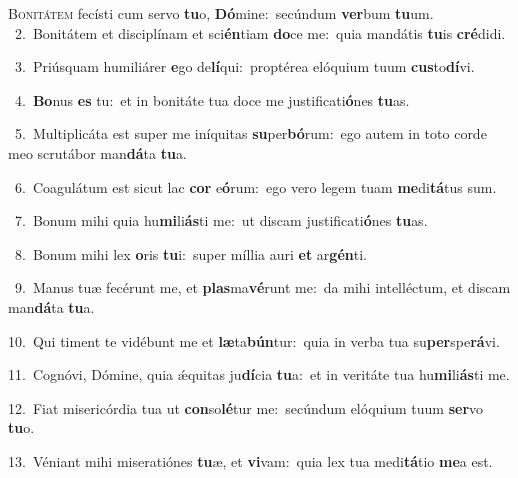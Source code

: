 \lettrine{\initial\textcolor{\initialcolor}{B}}{onitátem} fecísti cum servo \textbf{tu}\-o, \textbf{Dó}\-mine:~\star secúndum \textbf{ver}\-bum \textbf{tu}\-um.\\
{\numbfont\textcolor{\numbcolor}{~2.}}~Bonitátem et disciplínam et sci\-\textbf{én}\-tiam \textbf{do}\-ce me:~\star quia mandátis \textbf{tu}\-is \textbf{cré}\-didi.\par
{\numbfont\textcolor{\numbcolor}{~3.}}~Priúsquam humiliárer \textbf{e}\-go de\-\textbf{lí}\-qui:~\star proptérea elóquium tuum \textbf{cus}\-to\-\textbf{dí}\-vi.\par
{\numbfont\textcolor{\numbcolor}{~4.}}~\-\textbf{Bo}\-nus \textbf{es} tu:~\star et in bonitáte tua doce me justificati\-\textbf{ó}\-nes \textbf{tu}\-as.\par
{\numbfont\textcolor{\numbcolor}{~5.}}~Multiplicáta est super me iníquitas \textbf{su}\-per\-\textbf{bó}\-rum:~\star ego autem in toto corde meo scrutábor man\-\textbf{dá}\-ta \textbf{tu}\-a.\par
{\numbfont\textcolor{\numbcolor}{~6.}}~Coagulátum est sicut lac \textbf{cor} e\-\textbf{ó}\-rum:~\star ego vero legem tuam \textbf{me}\-di\-\textbf{tá}\-tus sum.\par
{\numbfont\textcolor{\numbcolor}{~7.}}~Bonum mihi quia hu\-\textbf{mi}\-li\-\textbf{ás}\-ti me:~\star ut discam justificati\-\textbf{ó}\-nes \textbf{tu}\-as.\par
{\numbfont\textcolor{\numbcolor}{~8.}}~Bonum mihi lex \textbf{o}\-ris \textbf{tu}\-i:~\star super míllia auri \textbf{et} ar\-\textbf{gén}\-ti.\par
{\numbfont\textcolor{\numbcolor}{~9.}}~Manus tuæ fecérunt me, et \textbf{plas}\-ma\-\textbf{vé}\-runt me:~\star da mihi intelléctum, et discam man\-\textbf{dá}\-ta \textbf{tu}\-a.\par
{\numbfont\textcolor{\numbcolor}{10.}}~Qui timent te vidébunt me et \textbf{læ}\-ta\-\textbf{bún}\-tur:~\star quia in verba tua su\-\textbf{per}\-spe\-\textbf{rá}\-vi.\par
{\numbfont\textcolor{\numbcolor}{11.}}~Cognóvi, Dómine, quia ǽquitas ju\-\textbf{dí}\-cia \textbf{tu}\-a:~\star et in veritáte tua hu\-\textbf{mi}\-li\-\textbf{ás}\-ti me.\par
{\numbfont\textcolor{\numbcolor}{12.}}~Fiat misericórdia tua ut \textbf{con}\-so\-\textbf{lé}\-tur me:~\star secúndum elóquium tuum \textbf{ser}\-vo \textbf{tu}\-o.\par
{\numbfont\textcolor{\numbcolor}{13.}}~Véniant mihi miseratiónes \textbf{tu}\-æ, et \textbf{vi}\-vam:~\star quia lex tua medi\-\textbf{tá}\-tio \textbf{me}\-a est.\par

